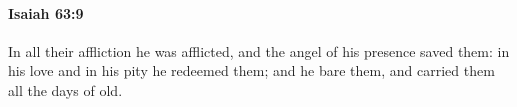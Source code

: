 
		\paragraph{Isaiah 63:9} %
			\label{ISAIAH-63-9}

			In all their affliction he was afflicted, and the angel of his presence saved them: in his love and in his pity he redeemed them; and he bare them, and carried them all the days of old.


